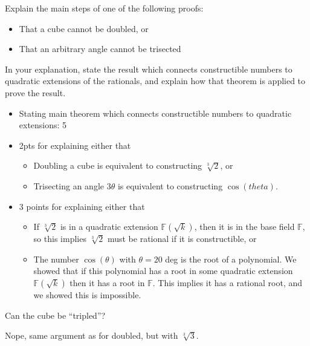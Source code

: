\documentclass[answers]{exam}
\begin{document}
\begin{questions}
\question Explain the main steps of one of the following proofs:
\begin{itemize}
  \item That a cube cannot be doubled, or
  \item That an arbitrary angle cannot be trisected
\end{itemize}
In your explanation, state the result which connects constructible numbers to quadratic
extensions of the rationals, and explain how that theorem is applied to prove the result.
\begin{solution}
  \begin{itemize}
    \item Stating main theorem which connects constructible numbers to quadratic extensions: 5
    \item 2pts for explaining either that
      \begin{itemize}
        \item Doubling a cube is equivalent to constructing $\sqrt[3]{2}$, or 
        \item Trisecting an angle $3\theta$ is equivalent to constructing $\cos(theta)$.
      \end{itemize}
    \item 3 points for explaining either that
      \begin{itemize}
        \item If $\sqrt[3]{2}$ is in a quadratic extension $\mathbb{F}(\sqrt{k})$, then it is in the base field $\mathbb{F}$,
          so this implies $\sqrt[3]{2}$ must be rational if it is constructible, or
        \item The number $\cos(\theta)$ with $\theta = 20$ deg is the root of a polynomial.  We showed that if this polynomial
          has a root in some quadratic extension $\mathbb{F}(\sqrt{k})$ then it has a root in $\mathbb{F}$. This implies it
          has a rational root, and we showed this is impossible.
      \end{itemize}
  \end{itemize}
\end{solution}


  \question Can the cube be ``tripled''?
  \begin{solution}
    Nope, same argument as for doubled, but with $\sqrt[3]{3}$.
  \end{solution}


\end{questions}
\end{document}
